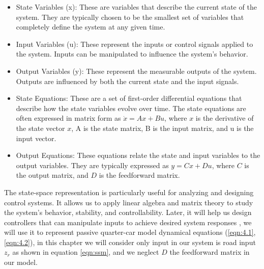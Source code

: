 \begin{itemize}
	\item State Variables (x): These are variables that describe the current state of the system. They are typically chosen to be the smallest set of variables that completely define the system at any given time.
	\item Input Variables (u): These represent the inputs or control signals applied to the system. Inputs can be manipulated to influence the system's behavior.
	\item Output Variables (y): These represent the measurable outputs of the system. Outputs are influenced by both the current state and the input signals.
	\item State Equations: These are a set of first-order differential equations that describe how the state variables evolve over time. The state equations are often expressed in matrix form as $\dot{x}=Ax+Bu$, where $x$ is the derivative of the state vector $x$, A is the state matrix, B is the input matrix, and u is the input vector.
	\item Output Equations: These equations relate the state and input variables to the output variables. They are typically expressed as $y=Cx+Du$, where $C$ is the output matrix, and $D$ is the feedforward matrix.
\end{itemize}

The state-space representation is particularly useful for analyzing and designing control systems. It allows us to apply linear algebra and matrix theory to study the system's behavior, stability, and controllability. Later, it will help us design controllers that can manipulate inputs to achieve desired system responses \cite{nguyen2023dynamic}, we will use it to represent passive quarter-car model dynamical equations (\ref{eqn:4.1}, \ref{eqn:4.2}), in this chapter we will consider only input in our system is road input $z_r$ as shown in equation \ref{eqn:ssm}, and we neglect $D$  the feedforward matrix in our model.

